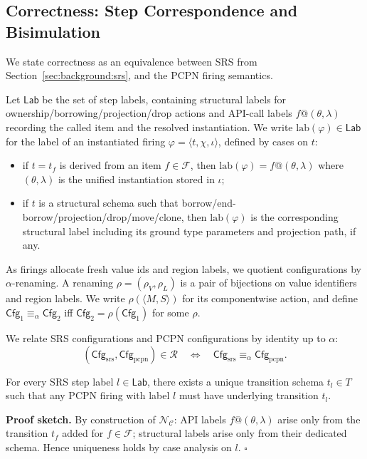 \documentclass[runningheads]{llncs}
\begin{document}
\subsection{Correctness: Step Correspondence and Bisimulation}
\label{sec:method:correctness}

We state correctness as an equivalence between SRS from Section~\ref{sec:background:srs}, and the PCPN firing semantics. 

Let $\mathsf{Lab}$ be the set of step labels, containing structural labels for ownership/borrowing/projection/drop actions and API-call labels $f@(\theta,\lambda)$ recording the called item and the resolved instantiation.
We write $\mathrm{lab}(\varphi)\in\mathsf{Lab}$ for the label of an instantiated firing $\varphi=\langle t,\chi,\iota\rangle$, defined by cases on $t$:
\begin{itemize}
  \item if $t=t_f$ is derived from an item $f\in\mathcal{F}$, then
  $\mathrm{lab}(\varphi)=f@(\theta,\lambda)$ where $(\theta,\lambda)$ is the unified instantiation stored in $\iota$;
  \item if $t$ is a structural schema such that borrow/end-borrow/projection/drop/move/clone, then
  $\mathrm{lab}(\varphi)$ is the corresponding structural label including its ground type parameters and projection path, if any.
\end{itemize}

As firings allocate fresh value ids and region labels, we quotient configurations by $\alpha$-renaming. A renaming $\rho=(\rho_V,\rho_L)$ is a pair of bijections on value identifiers and region labels. We write $\rho(\langle M,S\rangle)$ for its componentwise action, and define $\mathsf{Cfg}_1\equiv_\alpha \mathsf{Cfg}_2$ iff $\mathsf{Cfg}_2=\rho(\mathsf{Cfg}_1)$ for some $\rho$.

We relate SRS configurations and PCPN configurations by identity up to $\alpha$:
\begin{equation*}
    (\mathsf{Cfg}_{\mathrm{srs}},\mathsf{Cfg}_{\mathrm{pcpn}})\in\mathcal{R}
\quad\Longleftrightarrow\quad
\mathsf{Cfg}_{\mathrm{srs}}\equiv_\alpha \mathsf{Cfg}_{\mathrm{pcpn}}.
\end{equation*}

\begin{lemma}
\label{lem:schema-coverage}
For every SRS step label $l\in\mathsf{Lab}$, there exists a unique transition schema $t_l\in T$ such that any PCPN firing with label $l$ must have underlying transition $t_l$.
\end{lemma}
\noindent\textbf{Proof sketch.}
By construction of $\mathcal{N}_{\mathcal{C}}$: API labels $f@(\theta,\lambda)$ arise only from the transition $t_f$ added for $f\in\mathcal{F}$; structural labels arise only from their dedicated schema. Hence uniqueness holds by case analysis on $l$. \hfill $\square$
\end{document}

